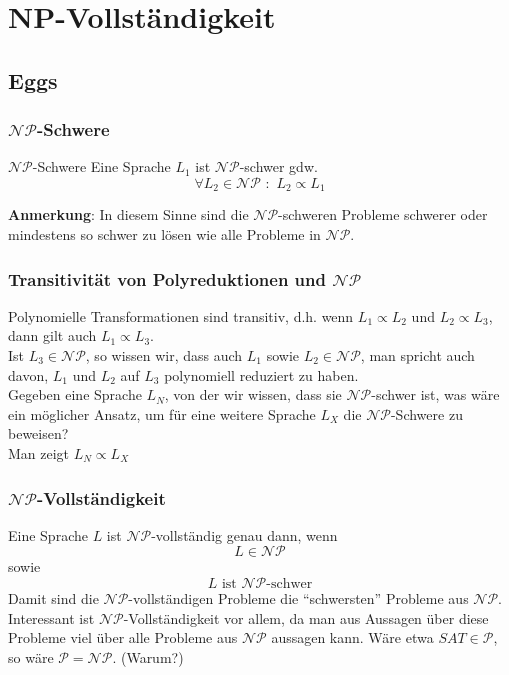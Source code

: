 \section{NP-Vollständigkeit}
\subsection{Eggs}
\begin{frame}
\frametitle{$\mathcal{NP}$-Schwere}
\begin{block}{$\mathcal{NP}$-Schwere}
Eine Sprache $L_1$ ist $\mathcal{NP}$-schwer gdw. 
\[\forall L_2 \in \mathcal{NP} \,\, : \,\, L_2 \propto L_1\]
\end{block}
\textbf{Anmerkung}: In diesem Sinne sind die $\mathcal{NP}$-schweren Probleme schwerer oder mindestens so schwer zu lösen wie alle Probleme in $\mathcal{NP}$.
\end{frame}

\begin{frame}
\frametitle{Transitivität von Polyreduktionen und $\mathcal{NP}$}
Polynomielle Transformationen sind transitiv, d.h. wenn $L_1 \propto L_2$ und $L_2 \propto L_3$, dann gilt auch $L_1 \propto L_3$.\\[8pt]
Ist $L_3 \in \mathcal{NP}$, so wissen wir, dass auch $L_1$ sowie $L_2 \in \mathcal{NP}$, man spricht auch davon, $L_1$ und $L_2$ auf $L_3$ polynomiell reduziert zu haben.\\[8pt]
Gegeben eine Sprache $L_N$, von der wir wissen, dass sie $\mathcal{NP}$-schwer ist, was wäre ein möglicher Ansatz, um für eine weitere Sprache $L_X$ die $\mathcal{NP}$-Schwere zu beweisen?\\
\invincible\pause
\ducttape{1.5cm}
Man zeigt $L_N \propto L_X$
\vincible
\end{frame}

\begin{frame}
\frametitle{$\mathcal{NP}$-Vollständigkeit}
Eine Sprache $L$ ist $\mathcal{NP}$-vollständig genau dann, wenn
$$L \in \mathcal{NP}$$ sowie $$L\mbox{ ist $\mathcal{NP}$-schwer}$$
Damit sind die $\mathcal{NP}$-vollständigen Probleme die "`schwersten"' Probleme aus $\mathcal{NP}$.\\
Interessant ist $\mathcal{NP}$-Vollständigkeit vor allem, da man aus Aussagen über diese Probleme viel über alle Probleme aus $\mathcal{NP}$ aussagen kann.
Wäre etwa $SAT \in \mathcal{P}$, so wäre $\mathcal{P} = \mathcal{NP}$. (Warum?)
\end{frame}

